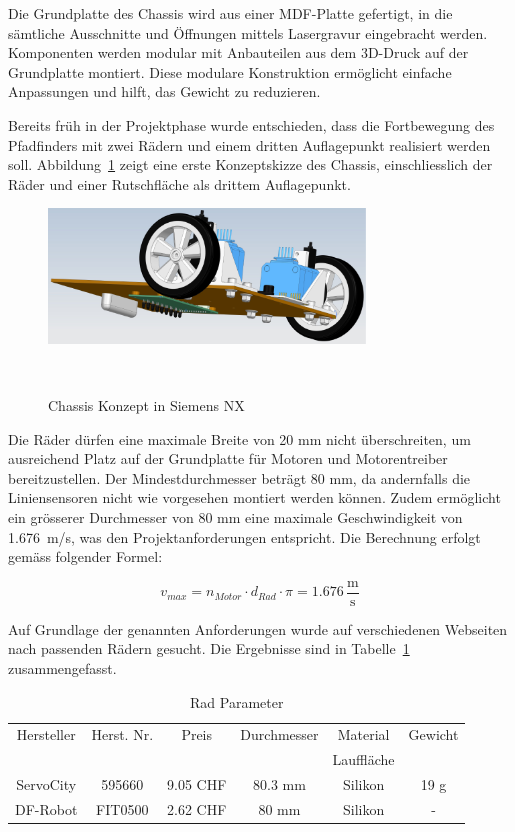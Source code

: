 \documentclass[main.tex]{subfiles} %
\begin{document}
Die Grundplatte des Chassis wird aus einer MDF-Platte gefertigt, in die sämtliche 
Ausschnitte und Öffnungen mittels Lasergravur eingebracht werden. Komponenten werden 
modular mit Anbauteilen aus dem 3D-Druck auf der Grundplatte montiert. Diese modulare 
Konstruktion ermöglicht einfache Anpassungen und hilft, das Gewicht zu reduzieren.

Bereits früh in der Projektphase wurde entschieden, dass die Fortbewegung des Pfadfinders 
mit zwei Rädern und einem dritten Auflagepunkt realisiert werden soll. 
Abbildung~\ref{fig:Radkonzept} zeigt eine erste Konzeptskizze des Chassis, einschliesslich 
der Räder und einer Rutschfläche als drittem Auflagepunkt.

\begin{figure}[H]
    \centering
    \includegraphics[width=0.75\textwidth]{Radkonzept.pdf}
    \caption{Chassis Konzept in Siemens NX}~\label{fig:Radkonzept}
\end{figure}

Die Räder dürfen eine maximale Breite von 20 mm nicht überschreiten, um ausreichend 
Platz auf der Grundplatte für Motoren und Motorentreiber bereitzustellen. Der 
Mindestdurchmesser beträgt 80 mm, da andernfalls die Liniensensoren nicht wie 
vorgesehen montiert werden können. Zudem ermöglicht ein grösserer Durchmesser 
von 80 mm eine maximale Geschwindigkeit von 1.676~m/s, was den 
Projektanforderungen entspricht. Die Berechnung erfolgt gemäss 
folgender Formel:

\[ v_{max} = n_{Motor} \cdot d_{Rad} \cdot \pi = 1.676 \, \frac{\text{m}}{\text{s}} \]

Auf Grundlage der genannten Anforderungen wurde auf verschiedenen Webseiten nach 
passenden Rädern gesucht. Die Ergebnisse sind in Tabelle~\ref{tab:Rad_Parameter} 
zusammengefasst.

\begin{table}[h]                                    %
    \centering
    \begin{tabular}{|c|c|c|c|c|c|}                        %
        \hline
        Hersteller  & Herst. Nr.    & Preis     & Durchmesser   & Material      & Gewicht   \\
                    &               &           &               & Lauffläche    &           \\ \hline
        ServoCity   & 595660        & 9.05 CHF  & 80.3 mm       & Silikon       & 19 g      \\ \hline
        DF-Robot    & FIT0500       & 2.62 CHF  & 80 mm         & Silikon       & -         \\ \hline
    \end{tabular}
    \caption{Rad Parameter}
    \label{tab:Rad_Parameter}
\end{table}
\end{document}
